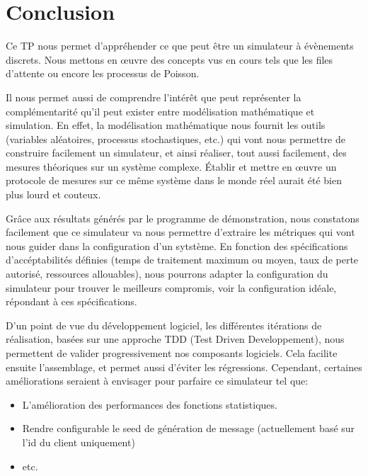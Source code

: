 \documentclass[11pt,a4paper]{article}
\begin{document}
\pagebreak

\section{Conclusion}
Ce TP nous permet d'appréhender ce que peut être un simulateur à évènements discrets. Nous mettons en œuvre des concepts vus en cours tels que les files d'attente ou encore les processus de Poisson.

Il nous permet aussi de comprendre l'intérêt que peut représenter la complémentarité qu'il peut exister entre modélisation mathématique et simulation. En effet, la modélisation mathématique nous fournit les outils (variables aléatoires, processus stochastiques, etc.) qui vont nous permettre de construire facilement un simulateur, et ainsi réaliser, tout aussi facilement, des mesures théoriques sur un système complexe. Établir et mettre en œuvre un protocole de mesures sur ce même système dans le monde réel aurait été bien plus lourd et couteux.

Grâce aux résultats générés par le programme de démonstration, nous constatons facilement que ce simulateur va nous permettre d'extraire les métriques qui vont nous guider dans la configuration d'un sytstème. En fonction des spécifications d'accéptabilités définies (temps de traitement maximum ou moyen, taux de perte autorisé, ressources allouables), nous pourrons adapter la configuration du simulateur pour trouver le meilleurs compromis, voir la configuration idéale, répondant à ces spécifications.

D'un point de vue du développement logiciel, les différentes itérations de réalisation, basées sur une approche TDD (Test Driven Developpement), nous permettent de valider progressivement nos composants logiciels. Cela facilite ensuite l'assemblage, et permet aussi d'éviter les régressions. Cependant, certaines améliorations seraient à envisager pour parfaire ce simulateur tel que:
\begin{itemize}
    \item L'amélioration des performances des fonctions statistiques.
    \item Rendre configurable le seed de génération de message (actuellement basé sur l'id du client uniquement)
    \item etc.
\end{itemize}



\end{document}
